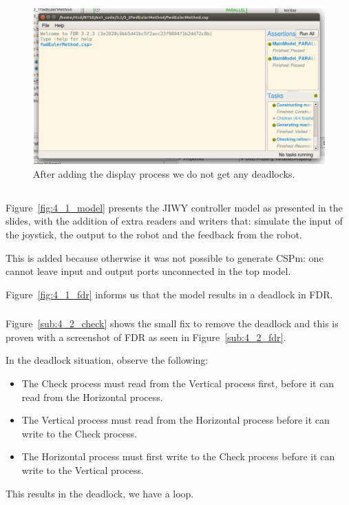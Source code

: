 \documentclass[a4paper,twoside,11pt]{article}
\begin{document}
\begin{figure}
	\centering
	\includegraphics[width=\textwidth]{./images/3-2_fdr.png}
	\caption{After adding the display process we do not get any deadlocks.}
	\label{fig:3_2_fdr}
\end{figure}

\FloatBarrier
\subsection{}
\subsubsection{}
Figure~\ref{fig:4_1_model} presents the JIWY controller model as presented in 
the slides, with the addition of extra readers and writers that: simulate the 
input of the joystick, the output to the robot and the feedback from the robot.

This is added because otherwise it was not possible to generate CSPm: one 
cannot leave input and output ports unconnected in the top model.

Figure~\ref{fig:4_1_fdr} informs us that the model results in a deadlock in FDR.

\subsubsection{}
Figure~\ref{sub:4_2_check} shows the small fix to remove the deadlock and this 
is proven with a screenshot of FDR as seen in Figure~\ref{sub:4_2_fdr}. 

In the deadlock situation, observe the following:

\begin{itemize}
	\item The Check process must read from the Vertical process first,
		before it can read from the Horizontal process.

	\item The Vertical process must read from the Horizontal process before
	       	it can write to the Check process.

	\item The Horizontal process must first write to the Check process before 
		it can write to the Vertical process.
\end{itemize}
This results in the deadlock, we have a loop.
\smallskip
\end{document}
